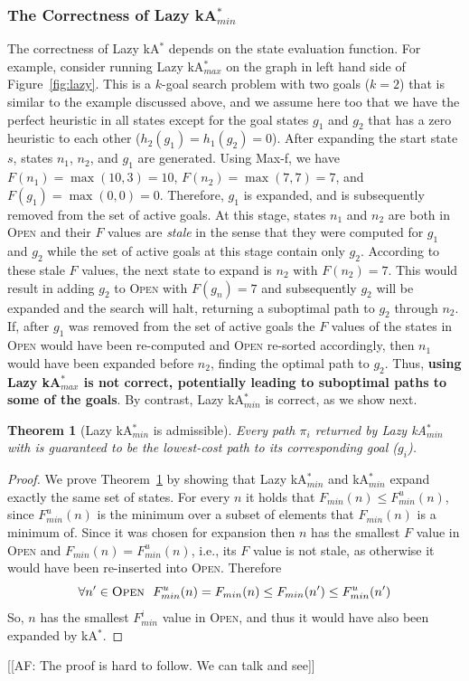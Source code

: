 \documentclass{aicom2e}
\newtheorem{theorem}{Theorem}
\newcommand{\kgs}{$k$-goal search}
\newcommand{\kastar}{kA$^*$}
\newcommand{\kastarmin}{kA$^*_{min}$}
\newcommand{\kastarmax}{kA$^*_{max}$}
\newcommand{\maxf}{Max-f}
\newcommand{\open}{\textsc{Open}}
\begin{document}
\subsubsection{The Correctness of Lazy \kastarmin{}}
The correctness of Lazy \kastar{} depends on the state evaluation function. For example, consider running Lazy \kastarmax{} on the graph in left hand side of Figure~\ref{fig:lazy}. This is a \kgs{} problem with two goals ($k=2$) that is similar to the example discussed above, and we assume here too that we have the perfect heuristic in all states except for the goal states $g_1$ and $g_2$ that has a zero heuristic to each other ($h_2(g_1)=h_1(g_2)=0$). After expanding the start state $s$, states $n_1$, $n_2$, and $g_1$ are generated. Using \maxf{}, we have $F(n_1)=\max(10,3)=10$, $F(n_2)=\max(7,7)=7$, and $F(g_1)=\max(0,0)=0$. Therefore, $g_1$ is expanded, and is subsequently removed from the set of active goals. At this stage, states $n_1$ and $n_2$ are both in \open{} and their $F$ values are {\em stale} in the sense that they were computed for $g_1$ and $g_2$ while the set of active goals at this stage contain only $g_2$. According to these stale $F$ values, the next state to expand is $n_2$ with $F(n_2)=7$. This would result in adding $g_2$ to \open{} with $F(g_n)=7$ and subsequently $g_2$ will be expanded and the search will halt, returning a suboptimal path to $g_2$ through $n_2$. If, after $g_1$ was removed from the set of active goals the $F$ values of the states in \open{} would have been re-computed and \open{} re-sorted accordingly, then $n_1$ would have been expanded before $n_2$, finding the optimal path to $g_2$. Thus, {\bf using Lazy \kastarmax{} is not correct, potentially leading to suboptimal paths to some of the goals}. By contrast, Lazy \kastarmin{} is correct, as we show next. 


\begin{theorem}[Lazy \kastarmin{} is admissible]
Every path $\pi_i$ returned by Lazy \kastarmin{} with is guaranteed to be the lowest-cost path to its corresponding goal ($g_i$).
\label{the:lazy-minf-correct}
\end{theorem}
\begin{proof}
	We prove Theorem~\ref{the:lazy-minf-correct} by showing that Lazy \kastarmin{} and \kastarmin{}  expand exactly the same set of states. For every $n$ it holds that $F_{min}(n)\leq F^u_{min}(n)$, since $F^u_{min}(n)$ is the minimum over a subset of elements that $F_{min}(n)$ is a minimum of. 
	Since it was chosen for expansion then $n$ has the smallest $F$ value in \open{}
	and $F_{min}(n)=F^u_{min}(n)$, i.e., its $F$ value is not stale, as otherwise it would have been re-inserted into \open{}. Therefore 
	\[ \forall n'\in\open{} ~~ F^u_{min}(n)=F_{min}(n)\leq F_{min}(n') \leq F^u_{min}(n') \]
	So, $n$ has the smallest $F^i_{min}$ value in \open{}, and thus it would have also been expanded by \kastar{}. 
\end{proof}
[[AF: The proof is hard to follow. We can talk and see]]
	
\end{document}
